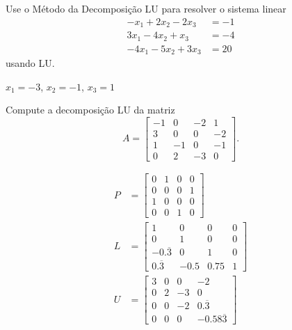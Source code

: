 \begin{exer}\label{exer:lup_sol}
  Use o Método da Decomposição LU para resolver o sistema linear
  \begin{align}
    -x_1 + 2x_2 - 2x_3 &= -1\\
    3x_1 - 4x_2 + x_3 &= -4\\
    -4x_1 - 5x_2 + 3x_3 &= 20
  \end{align}
  usando  LU.
\end{exer}
\begin{resp}
  $x_1 = -3$, $x_2=-1$, $x_3 = 1$
\end{resp}

\begin{exer}
  Compute a decomposição LU da matriz
  \begin{equation}
    A =
    \begin{bmatrix}
      -1 & 0 & -2 & 1\\
      3 & 0 & 0 & -2\\
      1 & -1 & 0 & -1\\
      0 & 2 & -3 & 0
    \end{bmatrix}.
  \end{equation}
\end{exer}
\begin{resp}
  \begin{align}
    P &=
        \begin{bmatrix}
          0 & 1 & 0 & 0\\
          0 & 0 & 0 & 1\\
          1 & 0 & 0 & 0\\
          0 & 0 & 1 & 0
        \end{bmatrix}\\
    L &=
        \begin{bmatrix}
          1 & 0 & 0 & 0\\
          0 & 1 & 0 & 0\\
          -0.\overline{3} & 0 & 1 & 0\\
          0.\overline{3} & -0.5 & 0.75 & 1
        \end{bmatrix}\\
    U &=
        \begin{bmatrix}
          3 & 0 & 0  & -2\\
          0 & 2 & -3 & 0\\
          0 & 0 & -2 & 0.\overline{3}\\
          0 & 0 & 0 & -0.58\overline{3}
        \end{bmatrix}
  \end{align}
\end{resp}

